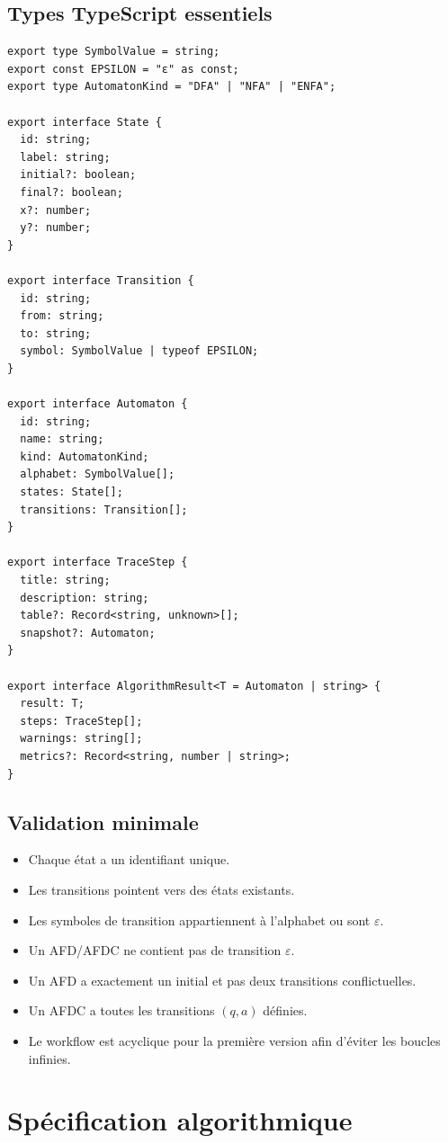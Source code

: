\documentclass[11pt,a4paper]{report}
\newcommand{\eps}{\ensuremath{\varepsilon}}
\begin{document}
\section{Types TypeScript essentiels}
\begin{lstlisting}
export type SymbolValue = string;
export const EPSILON = "ε" as const;
export type AutomatonKind = "DFA" | "NFA" | "ENFA";

export interface State {
  id: string;
  label: string;
  initial?: boolean;
  final?: boolean;
  x?: number;
  y?: number;
}

export interface Transition {
  id: string;
  from: string;
  to: string;
  symbol: SymbolValue | typeof EPSILON;
}

export interface Automaton {
  id: string;
  name: string;
  kind: AutomatonKind;
  alphabet: SymbolValue[];
  states: State[];
  transitions: Transition[];
}

export interface TraceStep {
  title: string;
  description: string;
  table?: Record<string, unknown>[];
  snapshot?: Automaton;
}

export interface AlgorithmResult<T = Automaton | string> {
  result: T;
  steps: TraceStep[];
  warnings: string[];
  metrics?: Record<string, number | string>;
}
\end{lstlisting}

\section{Validation minimale}
\begin{itemize}
  \item Chaque état a un identifiant unique.
  \item Les transitions pointent vers des états existants.
  \item Les symboles de transition appartiennent à l'alphabet ou sont \eps.
  \item Un AFD/AFDC ne contient pas de transition \eps.
  \item Un AFD a exactement un initial et pas deux transitions conflictuelles.
  \item Un AFDC a toutes les transitions $(q,a)$ définies.
  \item Le workflow est acyclique pour la première version afin d'éviter les boucles infinies.
\end{itemize}

\chapter{Spécification algorithmique}
\end{document}
